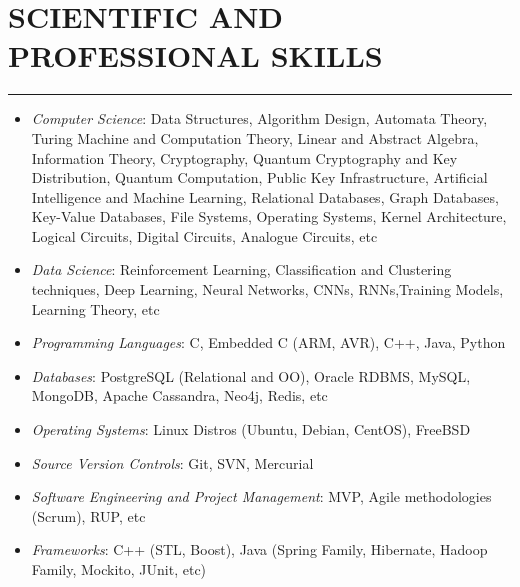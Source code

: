 \documentclass[10pt,a4paper]{article}
\begin{document}
\section{SCIENTIFIC AND PROFESSIONAL SKILLS}
\noindent \rule {10.0cm}{0.4pt}
\begin{itemize}
  \setlength{\rightskip}{2cm}
  \setlength\itemsep{0em}
  \item \small \textit {Computer Science}:
  Data Structures, Algorithm Design, Automata Theory, Turing Machine and Computation Theory, Linear and Abstract Algebra, Information Theory, Cryptography, Quantum Cryptography and Key Distribution, Quantum Computation, Public Key Infrastructure, Artificial Intelligence and Machine Learning,  Relational Databases, Graph Databases, Key-Value Databases, File Systems, Operating Systems, Kernel Architecture, Logical Circuits, Digital Circuits, Analogue Circuits, etc
  \item \small \textit{Data Science}:
  Reinforcement Learning, Classification and Clustering techniques, Deep Learning, Neural Networks, CNNs, RNNs,Training Models, Learning Theory, etc
  \item \small \textit {Programming Languages}: C, Embedded C (ARM, AVR), C++, Java, Python
  \item \small \textit {Databases}: PostgreSQL (Relational and OO), Oracle RDBMS, MySQL, MongoDB, Apache Cassandra, Neo4j, Redis, etc
  \item \small \textit {Operating Systems}: Linux Distros (Ubuntu, Debian, CentOS), FreeBSD
  \item \small \textit {Source Version Controls}: Git, SVN, Mercurial
  \item \small \textit {Software Engineering and Project Management}: MVP, Agile methodologies (Scrum), RUP, etc
  \item \small \textit {Frameworks}: C++ (STL, Boost), Java (Spring Family, Hibernate, Hadoop Family, Mockito, JUnit, etc)
\end{itemize}

\end{document}
